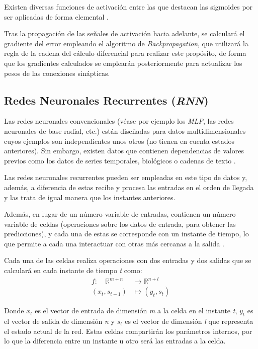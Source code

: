 
Existen diversas funciones de activación entre las que destacan las sigmoides por ser aplicadas de forma 
elemental \cite{book:aggarwal2018}.

Tras la propagación de las señales de activación hacia adelante, se calculará el gradiente del error empleando el algoritmo
de \textit{Backpropagation}, que utilizará la regla de la cadena del cálculo diferencial para realizar este propósito, de forma 
que los gradientes calculados se emplearán posteriormente para actualizar los pesos de las conexiones sinápticas.

\subsection{Redes Neuronales Recurrentes (\textit{RNN})}
Las redes neuronales convencionales (véase por ejemplo los \textit{MLP}, las redes neuronales de base radial, etc.) están diseñadas para
datos multidimensionales cuyos ejemplos son independientes unos otros (no tienen en cuenta estados anteriores).
Sin embargo, existen datos que contienen dependencias de valores previos como los datos de series temporales, 
biológicos o cadenas de texto \cite{book:aggarwal2018}.

Las redes neuronales recurrentes pueden ser empleadas en este tipo de datos y, además, a diferencia de estas recibe y procesa las 
entradas en el orden de llegada y las trata de igual manera que los instantes anteriores.

Además, en lugar de un número variable de entradas, contienen un número variable de celdas (operaciones sobre los datos de entrada, 
para obtener las predicciones), y cada una de estas se corresponde con un 
instante de tiempo, lo que permite a cada una interactuar con otras más cercanas a la salida \cite{book:aggarwal2018}.

Cada una de las celdas realiza operaciones con dos entradas y dos salidas que se calculará en cada instante de tiempo \textit{t} como:
\begin{equation}
    \begin{aligned}
    f: \quad \mathbb{R}^{m+n} & \rightarrow \mathbb{R}^{n+l} \\
    \left(x_t, s_{t-1}\right) & \mapsto\left(y_t, s_t\right)
    \end{aligned}
\end{equation}

Donde \(x_t\) es el vector de entrada de dimensión \textit{m} a la celda en el instante \textit{t}, \(y_{t}\) es el vector de salida de 
dimensión \textit{n} y \(s_{t}\) es el vector de dimensión \textit{l} que representa el estado actual de la red.
Estas celdas compartirán los parámetros internos, por lo que la diferencia entre un instante u otro será las entradas a la celda.

